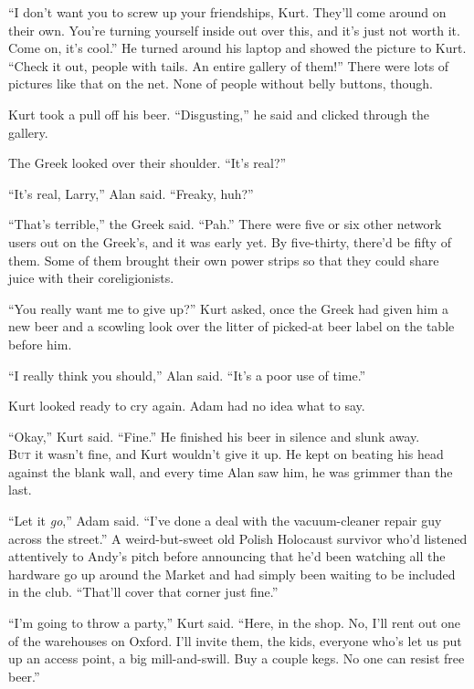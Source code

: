 \documentclass{article}
\begin{document}
``I don't want you to screw up your friendships, Kurt.  They'll come
around on their own.  You're turning yourself inside out over this,
and it's just not worth it.  Come on, it's cool.'' He turned around
his laptop and showed the picture to Kurt.  ``Check it out, people
with tails.  An entire gallery of them!'' There were lots of pictures
like that on the net.  None of people without belly buttons, though.

Kurt took a pull off his beer.  ``Disgusting,'' he said and clicked
through the gallery.

The Greek looked over their shoulder.  ``It's real?''

``It's real, Larry,'' Alan said.  ``Freaky, huh?''

``That's terrible,'' the Greek said.  ``Pah.'' There were five or six
other network users out on the Greek's, and it was early yet.  By
five-thirty, there'd be fifty of them.  Some of them brought their own
power strips so that they could share juice with their coreligionists.

``You really want me to give up?'' Kurt asked, once the Greek had
given him a new beer and a scowling look over the litter of picked-at
beer label on the table before him.

``I really think you should,'' Alan said.  ``It's a poor use of
time.''

Kurt looked ready to cry again.  Adam had no idea what to say.

``Okay,'' Kurt said.  ``Fine.'' He finished his beer in silence and
slunk away.
\\
\lettrine[lines=3, lhang=.5, nindent=0pt, findent=2pt]{B}{ut} it wasn't fine, and Kurt wouldn't give it up.  He kept on beating
his head against the blank wall, and every time Alan saw him, he was
grimmer than the last.

``Let it \textit{go},'' Adam said.  ``I've done a deal with the
vacuum-cleaner repair guy across the street.'' A weird-but-sweet old
Polish Holocaust survivor who'd listened attentively to Andy's pitch
before announcing that he'd been watching all the hardware go up
around the Market and had simply been waiting to be included in the
club.  ``That'll cover that corner just fine.''

``I'm going to throw a party,'' Kurt said.  ``Here, in the shop.  No,
I'll rent out one of the warehouses on Oxford.  I'll invite them, the
kids, everyone who's let us put up an access point, a big
mill-and-swill.  Buy a couple kegs.  No one can resist free beer.''
\end{document}
